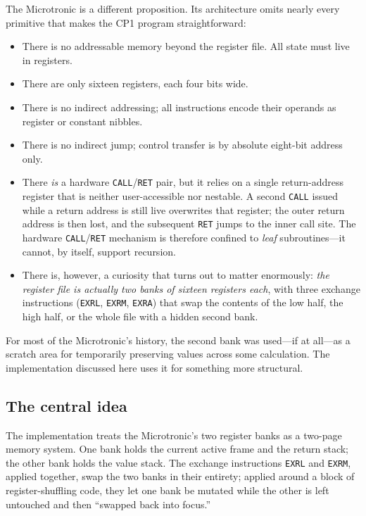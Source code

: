 \documentclass[11pt,a4paper]{article}
\begin{document}
The Microtronic is a different proposition. Its architecture omits
nearly every primitive that makes the CP1 program straightforward:

\begin{itemize}
  \item There is no addressable memory beyond the register file. All
    state must live in registers.
  \item There are only sixteen registers, each four bits wide.
  \item There is no indirect addressing; all instructions encode their
    operands as register or constant nibbles.
  \item There is no indirect jump; control transfer is by absolute
    eight-bit address only.
  \item There \emph{is} a hardware \texttt{CALL}/\texttt{RET} pair,
    but it relies on a single return-address register that is neither
    user-accessible nor nestable. A second \texttt{CALL} issued while
    a return address is still live overwrites that register; the
    outer return address is then lost, and the subsequent
    \texttt{RET} jumps to the inner call site. The hardware
    \texttt{CALL}/\texttt{RET} mechanism is therefore confined to
    \emph{leaf} subroutines---it cannot, by itself, support
    recursion.
  \item There is, however, a curiosity that turns out to matter
    enormously: \emph{the register file is actually two banks of
    sixteen registers each}, with three exchange instructions
    (\texttt{EXRL}, \texttt{EXRM}, \texttt{EXRA}) that swap the
    contents of the low half, the high half, or the whole file with a
    hidden second bank.
\end{itemize}

\noindent
For most of the Microtronic's history, the second bank was used---if
at all---as a scratch area for temporarily preserving values across
some calculation. The implementation discussed here uses it for
something more structural.

\subsection{The central idea}

The implementation treats the Microtronic's two register banks as a
two-page memory system. One bank holds the current active frame and
the return stack; the other bank holds the value stack. The exchange
instructions \texttt{EXRL} and \texttt{EXRM}, applied together, swap
the two banks in their entirety; applied around a block of
register-shuffling code, they let one bank be mutated while the other
is left untouched and then ``swapped back into focus.''
\end{document}
